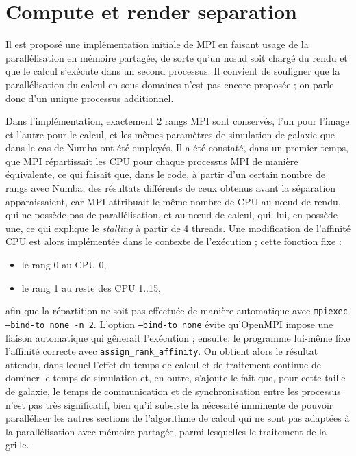 \section{Compute et render separation}

Il est proposé une implémentation initiale de MPI en faisant usage de la parallélisation en mémoire partagée, de sorte qu’un nœud soit chargé du rendu et que le calcul s’exécute dans un second processus. Il convient de souligner que la parallélisation du calcul en sous-domaines n’est pas encore proposée ; on parle donc d’un unique processus additionnel.

Dans l’implémentation, exactement 2 rangs MPI sont conservés, l’un pour l’image et l’autre pour le calcul, et les mêmes paramètres de simulation de galaxie que dans le cas de Numba ont été employés. Il a été constaté, dans un premier temps, que MPI répartissait les CPU pour chaque processus MPI de manière équivalente, ce qui faisait que, dans le code, à partir d’un certain nombre de rangs avec Numba, des résultats différents de ceux obtenus avant la séparation apparaissaient, car MPI attribuait le même nombre de CPU au nœud de rendu, qui ne possède pas de parallélisation, et au nœud de calcul, qui, lui, en possède une, ce qui explique le \textit{stalling} à partir de 4 threads. Une modification de l’affinité CPU est alors implémentée dans le contexte de l’exécution ; cette fonction fixe :

\begin{itemize}
    \item le rang 0 au CPU 0,
    \item le rang 1 au reste des CPU 1..15,
\end{itemize}

afin que la répartition ne soit pas effectuée de manière automatique avec \texttt{mpiexec --bind-to none -n 2}. L’option \texttt{--bind-to none} évite qu’OpenMPI impose une liaison automatique qui gênerait l’exécution ; ensuite, le programme lui-même fixe l’affinité correcte avec \texttt{assign\_rank\_affinity}. On obtient alors le résultat attendu, dans lequel l’effet du temps de calcul et de traitement continue de dominer le temps de simulation et, en outre, s’ajoute le fait que, pour cette taille de galaxie, le temps de communication et de synchronisation entre les processus n’est pas très significatif, bien qu’il subsiste la nécessité imminente de pouvoir paralléliser les autres sections de l’algorithme de calcul qui ne sont pas adaptées à la parallélisation avec mémoire partagée, parmi lesquelles le traitement de la grille.

